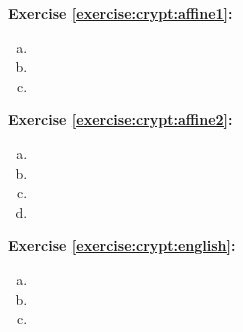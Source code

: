 
\noindent\textbf{Exercise \ref{exercise:crypt:affine1}:}
\begin{enumerate}[(a)]
\item
\item
\item
\end{enumerate}


\noindent\textbf{Exercise \ref{exercise:crypt:affine2}:}
\begin{enumerate}[(a)]
\item
\item
\item
\item
\end{enumerate}

\noindent\textbf{Exercise \ref{exercise:crypt:english}:}
\begin{enumerate}[(a)]
\item
\item
\item
\end{enumerate}

